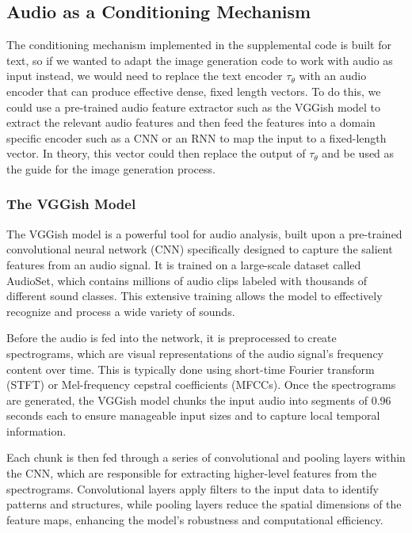 \documentclass{article}
\begin{document}
\subsection{Audio as a Conditioning Mechanism}

The conditioning mechanism implemented in the supplemental code is built for text, so if we wanted to adapt the image generation code to work with audio as input instead, we would need to replace the text encoder $\tau_{\theta}$ with an audio encoder that can produce effective dense, fixed length vectors. To do this, we could use a pre-trained audio feature extractor such as the VGGish model to extract the relevant audio features and then feed the features into a domain specific encoder such as a CNN or an RNN to map the input to a fixed-length vector. In theory, this vector could then replace the output of $\tau_{\theta}$ and be used as the guide for the image generation process.

\subsubsection{The VGGish Model}

The VGGish model is a powerful tool for audio analysis, built upon a pre-trained convolutional neural network (CNN) specifically designed to capture the salient features from an audio signal. It is trained on a large-scale dataset called AudioSet, which contains millions of audio clips labeled with thousands of different sound classes. This extensive training allows the model to effectively recognize and process a wide variety of sounds.

Before the audio is fed into the network, it is preprocessed to create spectrograms, which are visual representations of the audio signal's frequency content over time. This is typically done using short-time Fourier transform (STFT) or Mel-frequency cepstral coefficients (MFCCs). Once the spectrograms are generated, the VGGish model chunks the input audio into segments of 0.96 seconds each to ensure manageable input sizes and to capture local temporal information.

Each chunk is then fed through a series of convolutional and pooling layers within the CNN, which are responsible for extracting higher-level features from the spectrograms. Convolutional layers apply filters to the input data to identify patterns and structures, while pooling layers reduce the spatial dimensions of the feature maps, enhancing the model's robustness and computational efficiency.
\end{document}
